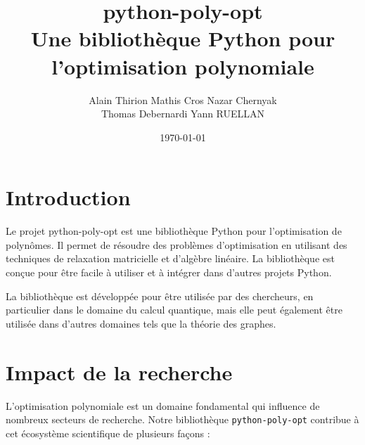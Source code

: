 \documentclass[11pt,a4paper]{article}
\title{
  \textbf{python-poly-opt} \\
  \large{Une bibliothèque Python pour l'optimisation polynomiale}
}
\author{
    Alain Thirion \quad
    Mathis Cros \quad
    Nazar Chernyak \\
    Thomas Debernardi \quad
    Yann RUELLAN
}
\date{\today}
\begin{document}
\maketitle


\section{Introduction}


Le projet python-poly-opt est une bibliothèque Python pour l'optimisation de polynômes. Il permet de résoudre des problèmes d'optimisation en utilisant des techniques de relaxation matricielle et d'algèbre linéaire. La bibliothèque est conçue pour être facile à utiliser et à intégrer dans d'autres projets Python.

La bibliothèque est développée pour être utilisée par des chercheurs, en particulier dans le domaine du calcul quantique, mais elle peut également être utilisée dans d'autres domaines tels que la théorie des graphes.

\section{Impact de la recherche}

L'optimisation polynomiale est un domaine fondamental qui influence de nombreux secteurs de recherche. Notre bibliothèque \texttt{python-poly-opt} contribue à cet écosystème scientifique de plusieurs façons :
\end{document}
